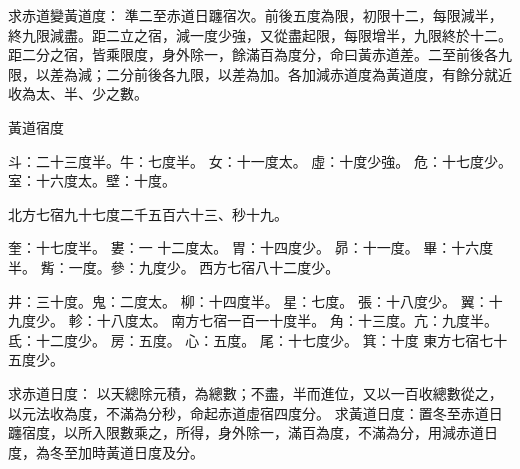 \begin{pinyinscope}
求赤道變黃道度：
 準二至赤道日躔宿次。前後五度為限，初限十二，每限減半，終九限減盡。距二立之宿，減一度少強，又從盡起限，每限增半，九限終於十二。距二分之宿，皆乘限度，身外除一，餘滿百為度分，命曰黃赤道差。二至前後各九限，以差為減；二分前後各九限，以差為加。各加減赤道度為黃道度，有餘分就近收為太、半、少之數。



 黃道宿度


斗：二十三度半。牛：七度半。
 女：十一度太。
 虛：十度少強。
 危：十七度少。
 室：十六度太。壁：十度。


北方七宿九十七度二千五百六十三、秒十九。


奎：十七度半。
 婁：一
 十二度太。
 胃：十四度少。
 昴：十一度。
 畢：十六度半。
 觜：一度。參：九度少。
 西方七宿八十二度少。


井：三十度。鬼：二度太。
 柳：十四度半。
 星：七度。
 張：十八度少。
 翼：十九度少。
 軫：十八度太。
 南方七宿一百一十度半。
 角：十三度。亢：九度半。
 氐：十二度少。
 房：五度。
 心：五度。
 尾：十七度少。
 箕：十度
 東方七宿七十五度少。


求赤道日度：
 以天總除元積，為總數；不盡，半而進位，又以一百收總數從之，以元法收為度，不滿為分秒，命起赤道虛宿四度分。
  求黃道日度：置冬至赤道日躔宿度，以所入限數乘之，所得，身外除一，滿百為度，不滿為分，用減赤道日度，為冬至加時黃道日度及分。



\end{pinyinscope}
